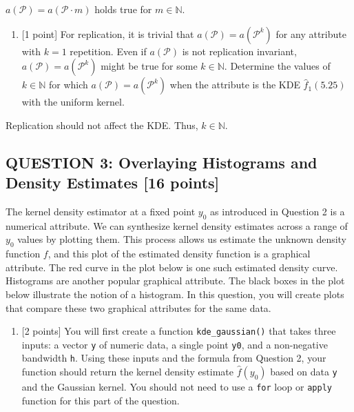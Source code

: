\documentclass[
]{article}
\providecommand{\tightlist}{%
  \setlength{\itemsep}{0pt}\setlength{\parskip}{0pt}}
\begin{document}
\(a(\mathcal P) = a(\mathcal P \cdot m)\) holds true for
\(m\in\mathbb{N}\).

\begin{enumerate}
\def\labelenumi{(\alph{enumi})}
\setcounter{enumi}{5}
\tightlist
\item
  {[}1 point{]} For replication, it is trivial that
  \(a(\mathcal{P}) = a(\mathcal{P}^k)\) for any attribute with \(k = 1\)
  repetition. Even if \(a(\mathcal{P})\) is not replication invariant,
  \(a(\mathcal{P}) =a(\mathcal{P}^k)\) might be true for some
  \(k \in \mathbb{N}\). Determine the values of \(k \in \mathbb{N}\) for
  which \(a(\mathcal{P}) =a(\mathcal{P}^k)\) when the attribute is the
  KDE \(\hat{f}_1(5.25)\) with the uniform kernel.
\end{enumerate}

Replication should not affect the KDE. Thus, \(k \in \mathbb{N}\).

\newpage

\hypertarget{question-3-overlaying-histograms-and-density-estimates-16-points}{%
\subsection{QUESTION 3: Overlaying Histograms and Density Estimates
{[}16
points{]}}\label{question-3-overlaying-histograms-and-density-estimates-16-points}}

The kernel density estimator at a fixed point \(y_0\) as introduced in
Question 2 is a numerical attribute. We can synthesize kernel density
estimates across a range of \(y_0\) values by plotting them. This
process allows us estimate the unknown density function \(f\), and this
plot of the estimated density function is a graphical attribute. The red
curve in the plot below is one such estimated density curve. Histograms
are another popular graphical attribute. The black boxes in the plot
below illustrate the notion of a histogram. In this question, you will
create plots that compare these two graphical attributes for the same
data.

\begin{enumerate}
\def\labelenumi{(\alph{enumi})}
\tightlist
\item
  {[}2 points{]} You will first create a function
  \texttt{kde\_gaussian()} that takes three inputs: a vector \texttt{y}
  of numeric data, a single point \texttt{y0}, and a non-negative
  bandwidth \texttt{h}. Using these inputs and the formula from Question
  2, your function should return the kernel density estimate
  \(\hat{f}(y_0)\) based on data \texttt{y} and the Gaussian kernel. You
  should not need to use a \texttt{for} loop or \texttt{apply} function
  for this part of the question.
\end{enumerate}
\end{document}
